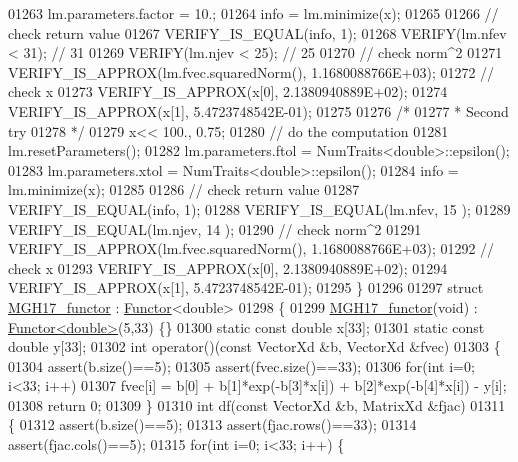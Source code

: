 \begin{DoxyCode}
01263   lm.parameters.factor = 10.;
01264   info = lm.minimize(x);
01265 
01266   \textcolor{comment}{// check return value}
01267   VERIFY\_IS\_EQUAL(info, 1);
01268   VERIFY(lm.nfev < 31); \textcolor{comment}{// 31}
01269   VERIFY(lm.njev < 25); \textcolor{comment}{// 25}
01270   \textcolor{comment}{// check norm^2}
01271   VERIFY\_IS\_APPROX(lm.fvec.squaredNorm(), 1.1680088766E+03);
01272   \textcolor{comment}{// check x}
01273   VERIFY\_IS\_APPROX(x[0], 2.1380940889E+02);
01274   VERIFY\_IS\_APPROX(x[1], 5.4723748542E-01);
01275 
01276   \textcolor{comment}{/*}
01277 \textcolor{comment}{   * Second try}
01278 \textcolor{comment}{   */}
01279   x<< 100., 0.75;
01280   \textcolor{comment}{// do the computation}
01281   lm.resetParameters();
01282   lm.parameters.ftol = NumTraits<double>::epsilon();
01283   lm.parameters.xtol = NumTraits<double>::epsilon();
01284   info = lm.minimize(x);
01285 
01286   \textcolor{comment}{// check return value}
01287   VERIFY\_IS\_EQUAL(info, 1); 
01288   VERIFY\_IS\_EQUAL(lm.nfev, 15 ); 
01289   VERIFY\_IS\_EQUAL(lm.njev, 14 ); 
01290   \textcolor{comment}{// check norm^2}
01291   VERIFY\_IS\_APPROX(lm.fvec.squaredNorm(), 1.1680088766E+03);
01292   \textcolor{comment}{// check x}
01293   VERIFY\_IS\_APPROX(x[0], 2.1380940889E+02);
01294   VERIFY\_IS\_APPROX(x[1], 5.4723748542E-01);
01295 \}
01296 
01297 \textcolor{keyword}{struct }\hyperlink{struct_m_g_h17__functor}{MGH17\_functor} : \hyperlink{struct_functor}{Functor}<double>
01298 \{
01299     \hyperlink{struct_m_g_h17__functor}{MGH17\_functor}(\textcolor{keywordtype}{void}) : \hyperlink{struct_functor}{Functor<double>}(5,33) \{\}
01300     \textcolor{keyword}{static} \textcolor{keyword}{const} \textcolor{keywordtype}{double} x[33];
01301     \textcolor{keyword}{static} \textcolor{keyword}{const} \textcolor{keywordtype}{double} y[33];
01302     \textcolor{keywordtype}{int} operator()(\textcolor{keyword}{const} VectorXd &b, VectorXd &fvec)
01303     \{
01304         assert(b.size()==5);
01305         assert(fvec.size()==33);
01306         \textcolor{keywordflow}{for}(\textcolor{keywordtype}{int} i=0; i<33; i++)
01307             fvec[i] =  b[0] + b[1]*exp(-b[3]*x[i]) +  b[2]*exp(-b[4]*x[i]) - y[i];
01308         \textcolor{keywordflow}{return} 0;
01309     \}
01310     \textcolor{keywordtype}{int} df(\textcolor{keyword}{const} VectorXd &b, MatrixXd &fjac)
01311     \{
01312         assert(b.size()==5);
01313         assert(fjac.rows()==33);
01314         assert(fjac.cols()==5);
01315         \textcolor{keywordflow}{for}(\textcolor{keywordtype}{int} i=0; i<33; i++) \{

\end{DoxyCode}
